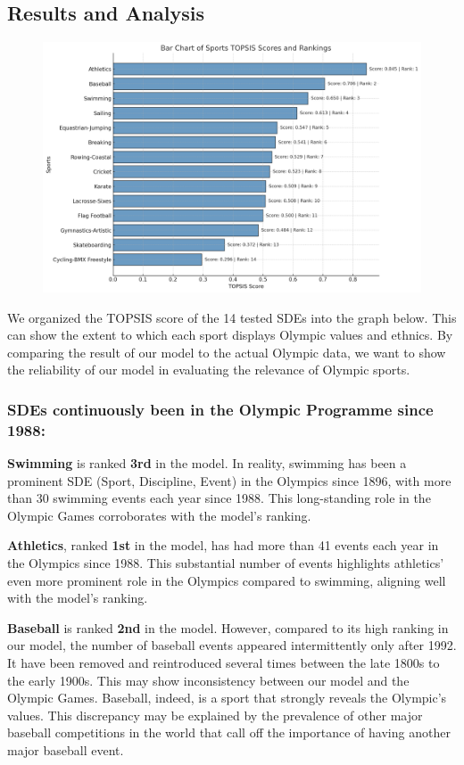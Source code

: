 \documentclass[12pt]{article}
\begin{document}
\subsection{Results and Analysis}
\begin{figure}[H]
    \centering
    \includegraphics[width=1\textwidth]{bargraph.jpg}
    \caption{\label{fig:}}
\end{figure}
We organized the TOPSIS score of the 14 tested SDEs into the graph below. This can show the extent to which each sport displays Olympic values and ethnics. By comparing the result of our model to the actual Olympic data, we want to show the reliability of our model in evaluating the relevance of Olympic sports.

\subsubsection{SDEs continuously been in the Olympic Programme since 1988:}

\textbf{Swimming} is ranked \textbf{3rd} in the model. In reality, swimming has been a prominent SDE (Sport, Discipline, Event) in the Olympics since 1896, with more than 30 swimming events each year since 1988. This long-standing role in the Olympic Games corroborates with the model's ranking.

\textbf{Athletics}, ranked \textbf{1st} in the model, has had more than 41 events each year in the Olympics since 1988. This substantial number of events highlights athletics' even more prominent role in the Olympics compared to swimming, aligning well with the model’s ranking.

\textbf{Baseball} is ranked \textbf{2nd} in the model. However, compared to its high ranking in our model, the number of baseball events appeared intermittently only after 1992. It have been removed and reintroduced several times between the late 1800s to the early 1900s. This may show inconsistency between our model and the Olympic Games. Baseball, indeed, is a sport that strongly reveals the Olympic's values. This discrepancy may be explained by the prevalence of other major baseball competitions in the world that call off the importance of having another major baseball event. 
\end{document}
